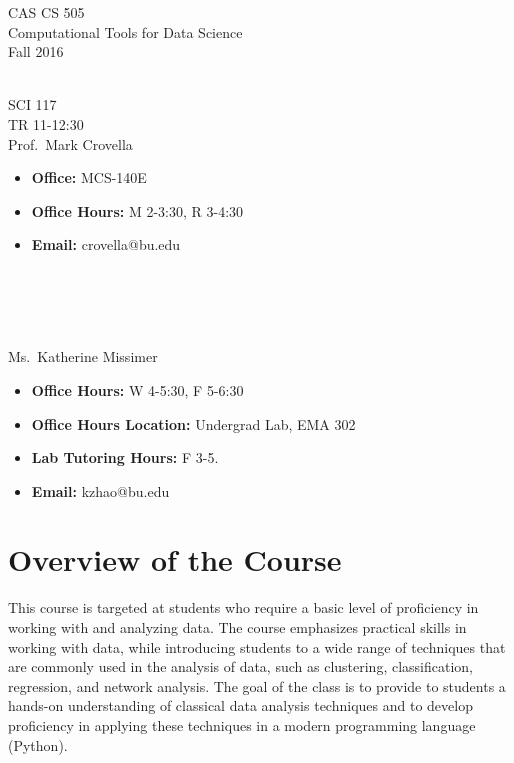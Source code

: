 \documentclass[11pt]{article}
\begin{document}
\sloppy 
\begin{center}
\LARGE CAS CS 505\\
\Large Computational Tools for Data Science\\
\Large\rm Fall 2016\\~\\
\end{center}

 SCI 117\\[\baselineskip]
 TR 11-12:30
\\[\baselineskip] 

 Prof.\ Mark Crovella\\[0.75\baselineskip]
\begin{minipage}[t]{0.60\textwidth}
\begin{itemize}
\item {\bf Office:} MCS-140E
\item {\bf Office Hours:} {\small M 2-3:30, R 3-4:30}
\item {\bf Email:} crovella@bu.edu
\end{itemize}
\end{minipage}
~\\~\\~\\~\\
  Ms.\ Katherine Missimer\\[0.75\baselineskip]
 \begin{minipage}[t]{0.60\textwidth}
 \begin{itemize}
 \item {\bf Office Hours:} {\small W 4-5:30, F 5-6:30}
 \item {\bf Office Hours Location:} Undergrad Lab, EMA 302
 \item {\bf Lab Tutoring Hours:} {\small F 3-5.}
 \item {\bf Email:} kzhao@bu.edu
 \end{itemize}
 \end{minipage}

\section*{Overview of the Course}

This course is targeted at students who require a basic level of
proficiency in working with and analyzing data.  The course emphasizes
practical skills in working with data, while introducing students to a
wide range of techniques that are commonly used in the analysis of data,
such as clustering, classification, regression, and network analysis.
The goal of the class is to provide to students a hands-on understanding
of classical data analysis techniques and to develop proficiency in
applying these techniques in a modern programming language (Python). 
\end{document}

